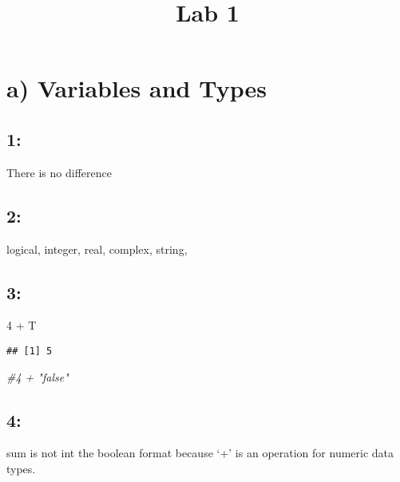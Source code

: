 \documentclass[
]{article}
\title{Lab 1}
\author{}
\date{\vspace{-2.5em}}
\newenvironment{Shaded}{\begin{snugshade}}{\end{snugshade}}
\newcommand{\CommentTok}[1]{\textcolor[rgb]{0.56,0.35,0.01}{\textit{#1}}}
\newcommand{\DecValTok}[1]{\textcolor[rgb]{0.00,0.00,0.81}{#1}}
\newcommand{\NormalTok}[1]{#1}
\newcommand{\SpecialCharTok}[1]{\textcolor[rgb]{0.00,0.00,0.00}{#1}}
\begin{document}
\maketitle

\hypertarget{a-variables-and-types}{%
\section{a) Variables and Types}\label{a-variables-and-types}}

\hypertarget{section}{%
\subsection{1:}\label{section}}

There is no difference

\hypertarget{section-1}{%
\subsection{2:}\label{section-1}}

logical, integer, real, complex, string,

\hypertarget{section-2}{%
\subsection{3:}\label{section-2}}

\begin{Shaded}
\begin{Highlighting}[]
\DecValTok{4} \SpecialCharTok{+}\NormalTok{ T}
\end{Highlighting}
\end{Shaded}

\begin{verbatim}
## [1] 5
\end{verbatim}

\begin{Shaded}
\begin{Highlighting}[]
\CommentTok{\#4 + "false"}
\end{Highlighting}
\end{Shaded}

\hypertarget{section-3}{%
\subsection{4:}\label{section-3}}

sum is not int the boolean format because `+' is an operation for
numeric data types.
\end{document}
